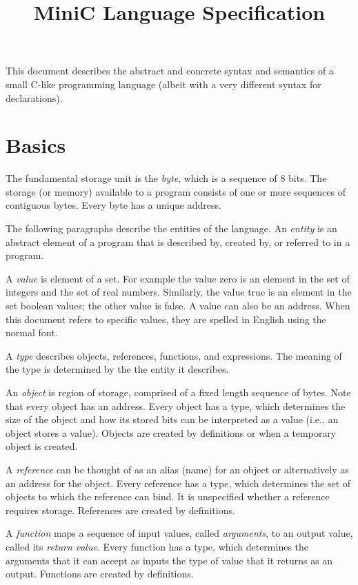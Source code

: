 \documentclass[11pt]{article}
\title{MiniC Language Specification}
\begin{document}
\maketitle

This document describes the abstract and concrete syntax and semantics of a small C-like programming language (albeit with a very different syntax for declarations).

\section{Basics}

The fundamental storage unit is the \emph{byte}, which is a sequence of 8 bits.
The storage (or memory) available to a program consists of one or more sequences of contiguous bytes. 
Every byte has a unique address.

The following paragraphs describe the entities of the language. An \emph{entity} is an abstract element of a program that is described by, created by, or
referred to in a program.

A \emph{value} is element of a set.
For example the value zero is an element in the set of integers and the set of real numbers.
Similarly, the value true is an element in the set boolean values; the other value is false.
A value can also be an address.
When this document refers to specific values, they are spelled in English using the normal font.

A \emph{type} describes objects, references, functions, and expressions.
The meaning of the type is determined by the the entity it describes.

An \emph{object} is region of storage, comprised of a fixed length sequence
of bytes.
Note that every object has an address.
Every object has a type, which determines the size of the object and how its stored bits can be interpreted as a value (i.e., an object stores a value).
Objects are created by definitions or when a temporary object is created.

A \emph{reference} can be thought of as an alias (name) for an object or alternatively as an address for the object.
Every reference has a type, which determines the set of objects to which the reference can bind.
It is unspecified whether a reference requires storage.
References are created by definitions.

A \emph{function} maps a sequence of input values, called \emph{arguments},
to an output value, called its \emph{return value}.
Every function has a type, which determines the arguments that it can accept as inputs the type of value that it returns as an output.
Functions are created by definitions.
\end{document}
